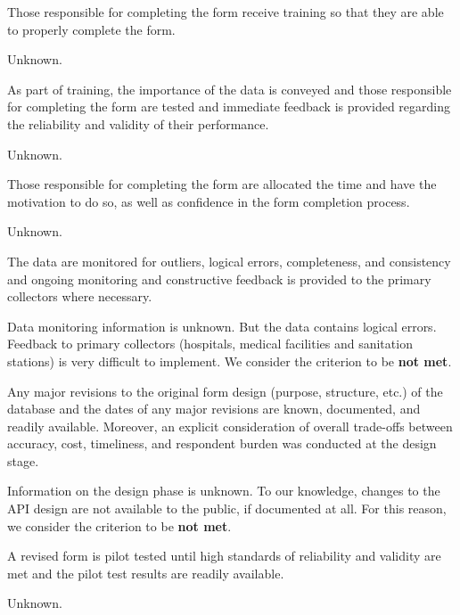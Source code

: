 \begin{QandA}
    \item Those responsible for completing the form receive training so that they are able to properly complete the form.
    \begin{answered}
        Unknown.
    \end{answered}

    \item As part of training, the importance of the data is conveyed and those responsible for completing the form are tested and immediate feedback is provided regarding the reliability and validity of their performance.
    \begin{answered}
        Unknown.
    \end{answered}

    \item Those responsible for completing the form are allocated the time and have the motivation to do so, as well as confidence in the form completion process.
    \begin{answered}
        Unknown.
    \end{answered}

    \item The data are monitored for outliers, logical errors, completeness, and consistency and ongoing monitoring and constructive feedback is provided to the primary collectors where necessary.
    \begin{answered}
        Data monitoring information is unknown. But the data contains logical errors.
        Feedback to primary collectors (hospitals, medical facilities and sanitation stations) is very difficult to implement.
        We consider the criterion to be \textbf{not met}.
    \end{answered}

    \item Any major revisions to the original form design (purpose, structure, etc.) of the database and the dates of any major revisions are known, documented, and readily available. Moreover, an explicit consideration of overall trade-offs between accuracy, cost, timeliness, and respondent burden was conducted at the design stage.
    \begin{answered}
        Information on the design phase is unknown.
        To our knowledge, changes to the API design are not available to the public, if documented at all.
        For this reason, we consider the criterion to be \textbf{not met}.
    \end{answered}

    \item A revised form is pilot tested until high standards of reliability and validity are met and the pilot test results are readily available.
    \begin{answered}
        Unknown.
    \end{answered}

\end{QandA}

